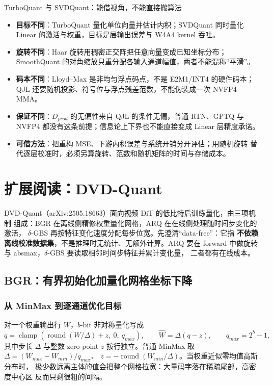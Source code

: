 \begin{kaogu}[F3]{TurboQuant 与 SVDQuant：能借视角，不能直接搬算法}
\begin{itemize}[itemsep=0.5pt,topsep=1pt]
  \item \textbf{目标不同}：TurboQuant 量化单位向量并估计内积；SVDQuant 同时量化
        Linear 的激活与权重，目标是层输出误差与 W4A4 kernel 吞吐。
  \item \textbf{旋转不同}：Haar 旋转用稠密正交阵把任意向量变成已知坐标分布；
        SmoothQuant 的对角缩放只重分配各输入通道幅值，两者不能混称“平滑”。
  \item \textbf{码本不同}：Lloyd--Max 是非均匀浮点码点，不是 E2M1/INT4 的硬件码本；
        QJL 还要随机投影、符号位与浮点残差范数，不能伪装成一次 NVFP4 MMA。
  \item \textbf{保证不同}：$D_{prod}$ 的无偏性来自 QJL 的条件无偏，普通 RTN、GPTQ
        与 NVFP4 都没有这条前提；信息论上下界也不能直接变成 Linear 层精度承诺。
  \item \textbf{可借方法}：把重构 MSE、下游内积误差与系统开销分开评估；用随机旋转
        替代逐层校准时，必须另算旋转、范数和随机矩阵的时间与存储成本。
\end{itemize}
\end{kaogu}

\section{扩展阅读：DVD-Quant}\label{sec:38-dvd}

DVD-Quant（arXiv:2505.18663）面向视频 DiT 的低比特后训练量化，由三项机制
组成：BGR 在离线侧精修权重量化网格，ARQ 在在线侧处理随时间步变化的激活，
$\delta$-GBS 再按特征变化速度分配每步位宽。先澄清“data-free”：它指
\textbf{不依赖离线校准数据集}，不是推理时无统计、无额外计算。ARQ 要在
forward 中做旋转与 absmax，$\delta$-GBS 要读取相邻时间步特征并累计变化量，
二者都有在线成本。

\subsection{BGR：有界初始化加量化网格坐标下降}

\subsubsection{从 MinMax 到逐通道优化目标}

对一个权重输出行 $W$，$b$-bit 非对称量化写成
\begin{equation}
  q=\operatorname{clamp}\!\left(
  \operatorname{round}(W/\Delta)+z,\ 0,\ q_{max}\right),\qquad
  \widehat W=\Delta(q-z),\qquad q_{max}=2^b-1,
  \label{eq:38-dvd-minmax}
\end{equation}
其中步长 $\Delta$ 与整数 zero-point $z$ 按行独立。普通 MinMax 取
$\Delta=(W_{max}-W_{min})/q_{max}$、
$z=-\operatorname{round}(W_{min}/\Delta)$。当权重近似零均值高斯分布时，
极少数远离主体的值会把整个网格拉宽：大量码字落在稀疏尾部，高密度中心区
反而只剩很粗的间隔。

